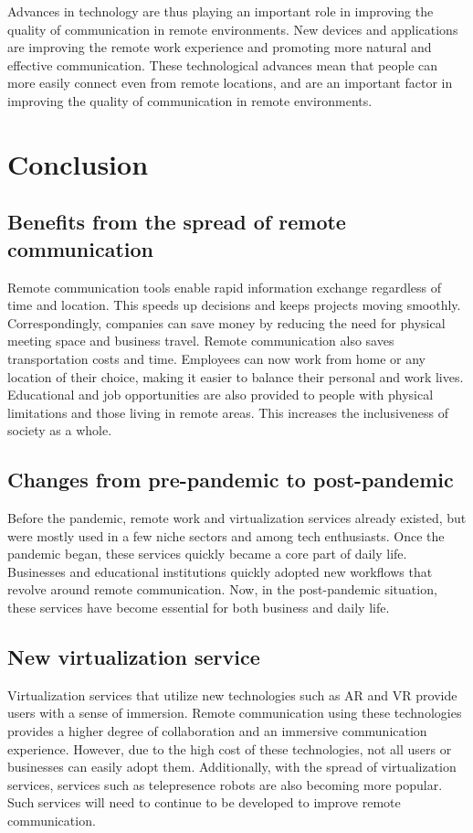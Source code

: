 \documentclass[12pt]{article}
\begin{document}
Advances in technology are thus playing an important role in improving the
quality of communication in remote environments. New devices and applications
are improving the remote work experience and promoting more natural and
effective communication. These technological advances mean that people can more
easily connect even from remote locations, and are an important factor in
improving the quality of communication in remote environments.

\section{Conclusion}
\subsection{Benefits from the spread of remote communication}
Remote communication tools enable rapid information exchange regardless of
time and location. This speeds up decisions and keeps projects moving smoothly.
Correspondingly, companies can save money by reducing the need for physical
meeting space and business travel. Remote communication also saves
transportation costs and time. Employees can now work from home or any location
of their choice, making it easier to balance their personal and work lives.
Educational and job opportunities are also provided to people with physical
limitations and those living in remote areas. This increases the inclusiveness
of society as a whole.

\subsection{Changes from pre-pandemic to post-pandemic}
Before the pandemic, remote work and virtualization services already existed,
but were mostly used in a few niche sectors and among tech enthusiasts. Once
the pandemic began, these services quickly became a core part of daily life.
Businesses and educational institutions quickly adopted new workflows that
revolve around remote communication. Now, in the post-pandemic situation, these
services have become essential for both business and daily life.

\subsection{New virtualization service}
Virtualization services that utilize new technologies such as AR and VR provide
users with a sense of immersion. Remote communication using these technologies
provides a higher degree of collaboration and an immersive communication
experience. However, due to the high cost of these technologies, not all users
or businesses can easily adopt them. Additionally, with the spread of
virtualization services, services such as telepresence robots are also becoming
more popular. Such services will need to continue to be developed to improve
remote communication.
\end{document}
